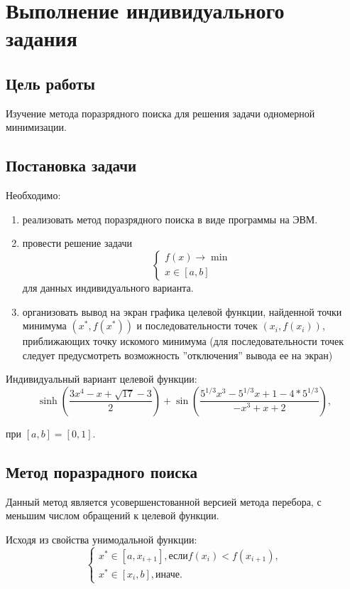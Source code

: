 \chapter{Выполнение индивидуального задания}

\section{Цель работы}

Изучение метода поразрядного поиска для решения задачи одномерной минимизации.

\section{Постановка задачи}

Необходимо:
\begin{enumerate}
\item реализовать метод поразрядного поиска в виде программы на ЭВМ.
\item провести решение задачи
\begin{equation*}
\begin{cases}
f(x) \rightarrow \min \\
x \in [a, b]
\end{cases}
\end{equation*}
для данных индивидуального варианта.
\item организовать вывод на экран графика целевой функции, найденной точки минимума $(x^* , f (x^*))$ и последовательности точек $(x_i, f(x_i))$, приближающих точку искомого минимума (для последовательности точек следует предусмотреть возможность ”отключения” вывода ее на экран)
\end{enumerate}

Индивидуальный вариант целевой функции:
\begin{equation*}
\sinh\left(\frac{3x^4 - x + \sqrt{17} - 3}{2}\right)+\sin\left(\frac{5^{1/3}x^3 - 5^{1/3}x + 1 - 4*5^{1/3}}{-x^3 + x + 2}\right),
\end{equation*}

при $[a, b] = [0, 1]$.

\section*{Метод поразрадного поиска}

Данный метод является усовершенстованной версией метода перебора, с меньшим числом обращений к целевой функции.

Исходя из свойства унимодальной функции:
\begin{equation*}
\begin{cases}
x^* \in [a, x_{i+1}], \text{если} f(x_i) < f(x_{i+1}), \\
x^* \in [x_i, b], \text{иначе}.
\end{cases}
\end{equation*}

